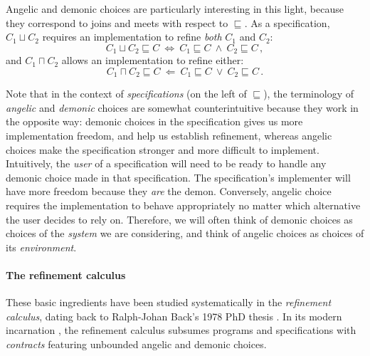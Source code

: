 \documentclass[sigplan,screen]{acmart}
\begin{document}
Angelic and demonic choices
are particularly interesting in this light,
because they correspond to joins and meets
with respect to $\sqsubseteq$.
As a specification, $C_1 \sqcup C_2$
requires an implementation to refine
\emph{both} $C_1$ and $C_2$:
\[
    C_1 \sqcup C_2 \sqsubseteq C \: \Leftrightarrow \:
    C_1 \sqsubseteq C \: \wedge \: C_2 \sqsubseteq C \,,
\]
and $C_1 \sqcap C_2$
allows an implementation to refine
either:
\[
    C_1 \sqcap C_2 \sqsubseteq C \: \Leftarrow \:
    C_1 \sqsubseteq C \: \vee \: C_2 \sqsubseteq C \,.
\]

Note that in the context of \emph{specifications}
(on the left of $\sqsubseteq$),
the terminology of \emph{angelic} and \emph{demonic}
choices are somewhat counterintuitive
because they work in the opposite way:
demonic choices in the specification gives us more
implementation freedom,
and help us establish refinement,
whereas angelic choices make the specification
stronger and more difficult to implement.
Intuitively,
the \emph{user} of a specification
will need to be ready to handle any demonic choice
made in that specification.
The specification's implementer
will have more freedom because they \emph{are} the demon.
Conversely,
angelic choice requires the implementation
to behave appropriately
no matter which alternative the user decides to rely on.
Therefore,
we will often think of demonic choices as
choices of the \emph{system} we are considering,
and think of angelic choices as
choices of its \emph{environment}.


\paragraph{The refinement calculus} %

These basic ingredients have been studied systematically
in the \emph{refinement calculus},
dating back to Ralph-Johan Back's 1978 PhD thesis \cite{backthesis}.
In its modern incarnation \cite{refcal},
the refinement calculus
subsumes programs and specifications with \emph{contracts}
featuring unbounded angelic and demonic choices.

\end{document}
